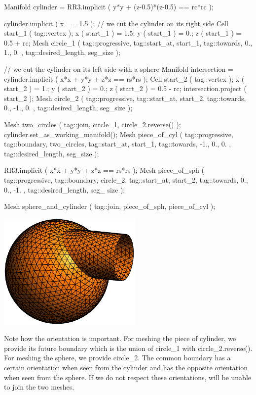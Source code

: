    Manifold cylinder = RR3.implicit ( y*y + (z-0.5)*(z-0.5) == rc*rc );

   cylinder.implicit ( x == 1.5 );  // we cut the cylinder on its right side
   Cell start_1 ( tag::vertex );
   x ( start_1 ) = 1.5;  y ( start_1 ) = 0.;  z ( start_1 ) = 0.5 + rc;
   Mesh circle_1 ( tag::progressive, tag::start_at, start_1,
                   tag::towards, { 0., 1., 0. }, tag::desired_length, seg_size );

   // we cut the cylinder on its left side with a sphere
   Manifold intersection = cylinder.implicit ( x*x + y*y + z*z == rs*rs );
   Cell start_2 ( tag::vertex );
   x ( start_2 ) = 1.;  y ( start_2 ) = 0.;  z ( start_2 ) = 0.5 - rc;
   intersection.project ( start_2 );
   Mesh circle_2 ( tag::progressive, tag::start_at, start_2,
                   tag::towards, { 0., -1., 0. }, tag::desired_length, seg_size );

   Mesh two_circles ( tag::join, circle_1, circle_2.reverse() );
   cylinder.set_as_working_manifold();
   Mesh piece_of_cyl ( tag::progressive, tag::boundary, two_circles,
                       tag::start_at, start_1, tag::towards, { -1., 0., 0. },
                       tag::desired_length, seg_size                          );

   RR3.implicit ( x*x + y*y + z*z == rs*rs );
   Mesh piece_of_sph ( tag::progressive, tag::boundary, circle_2,
                       tag::start_at, start_2, tag::towards, { 0., 0., -1. },
                       tag::desired_length, seg_ size                         );

   Mesh sphere_and_cylinder ( tag::join, piece_of_sph, piece_of_cyl );
\endverbatim

\medskip
\centerline{\includegraphics[width=70mm]{sphere-cyl.eps}}
\medskip

Note how the orientation is important.
For meshing the piece of cylinder, we provide its future boundary which is the union of
{\codett circle\_1} with {\codett circle\_2.reverse()}.
For meshing the sphere, we provide {\codett circle\_2}.
The common boundary has a certain orientation when seen from the cylinder and has the opposite
orientation when seen from the sphere.
If we do not respect these orientations, {\maniFEM} will be unable to {\codett join} the two
meshes.

